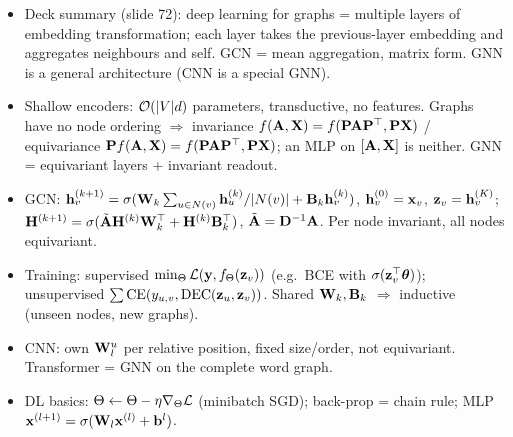 \bigskip{}
{}
\begin{summarybox}
  \begin{itemize}
    \item Deck summary (slide 72): deep learning for graphs = multiple layers of
      embedding transformation; each layer takes the previous-layer embedding
      and aggregates neighbours and self. GCN = mean aggregation, matrix form.
      GNN is a general architecture (CNN is a special GNN).
    \item Shallow encoders: $\mathcal{O}(|V|d)$ parameters, transductive, no features.
      Graphs have no node ordering $\Rightarrow$ invariance
      $f(\mathbf{A},\mathbf{X})=f(\mathbf{P}\mathbf{A}\mathbf{P}^{\top},\mathbf{P}\mathbf{X})$ / equivariance
      $\mathbf{P} f(\mathbf{A},\mathbf{X})=f(\mathbf{P}\mathbf{A}\mathbf{P}^{\top},\mathbf{P}\mathbf{X})$; an MLP on $[\mathbf{A},\mathbf{X}]$ is neither.
      GNN = equivariant layers + invariant readout.
    \item GCN:
      $\mathbf{h}_v^{(k+1)}=\sigma(\mathbf{W}_k\sum_{u\in N(v)}\mathbf{h}_u^{(k)}/|N(v)|+\mathbf{B}_k\mathbf{h}_v^{(k)})$,
      $\mathbf{h}_v^{(0)}=\mathbf{x}_v$, $\mathbf{z}_v=\mathbf{h}_v^{(K)}$;
      $\mathbf{H}^{(k+1)}=\sigma(\tilde{\mathbf{A}}\mathbf{H}^{(k)}\mathbf{W}_k^{\top}+\mathbf{H}^{(k)}\mathbf{B}_k^{\top})$,
      $\tilde{\mathbf{A}}=\mathbf{D}^{-1}\mathbf{A}$. Per node invariant, all nodes equivariant.
    \item Training: supervised $\min_\Theta\mathcal{L}(\mathbf{y},f_\Theta(\mathbf{z}_v))$ (e.g.\
      BCE with $\sigma(\mathbf{z}_v^{\top}\bm{\theta})$); unsupervised
      $\sum\mathrm{CE}(y_{u,v},\operatorname{DEC}(\mathbf{z}_u,\mathbf{z}_v))$. Shared $\mathbf{W}_k,\mathbf{B}_k$
      $\Rightarrow$ inductive (unseen nodes, new graphs).
    \item CNN: own $\mathbf{W}_l^u$ per relative position, fixed size/order, not
      equivariant. Transformer = GNN on the complete word graph.
    \item DL basics: $\Theta\leftarrow\Theta-\eta\nabla_\Theta\mathcal{L}$ (minibatch
      SGD); back-prop = chain rule; MLP $\mathbf{x}^{(l+1)}=\sigma(\mathbf{W}_l\mathbf{x}^{(l)}+\mathbf{b}^l)$.
  \end{itemize}
\end{summarybox}
